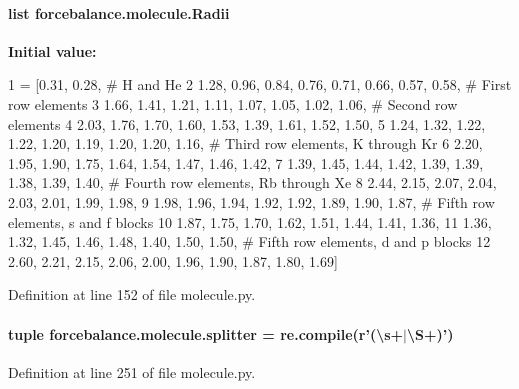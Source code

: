 \hypertarget{namespaceforcebalance_1_1molecule_a74f55a89a14ca676b5a06441d1fdab19}{
\paragraph[{Radii}]{\setlength{\rightskip}{0pt plus 5cm}list forcebalance.\-molecule.\-Radii}}\label{namespaceforcebalance_1_1molecule_a74f55a89a14ca676b5a06441d1fdab19}
{\bfseries Initial value\-:}
\begin{DoxyCode}
1 = [0.31, 0.28, \textcolor{comment}{# H and He}
2          1.28, 0.96, 0.84, 0.76, 0.71, 0.66, 0.57, 0.58, \textcolor{comment}{# First row elements}
3          1.66, 1.41, 1.21, 1.11, 1.07, 1.05, 1.02, 1.06, \textcolor{comment}{# Second row elements}
4          2.03, 1.76, 1.70, 1.60, 1.53, 1.39, 1.61, 1.52, 1.50, 
5          1.24, 1.32, 1.22, 1.22, 1.20, 1.19, 1.20, 1.20, 1.16, \textcolor{comment}{# Third row elements, K through Kr}
6          2.20, 1.95, 1.90, 1.75, 1.64, 1.54, 1.47, 1.46, 1.42, 
7          1.39, 1.45, 1.44, 1.42, 1.39, 1.39, 1.38, 1.39, 1.40, \textcolor{comment}{# Fourth row elements, Rb through Xe}
8          2.44, 2.15, 2.07, 2.04, 2.03, 2.01, 1.99, 1.98, 
9          1.98, 1.96, 1.94, 1.92, 1.92, 1.89, 1.90, 1.87, \textcolor{comment}{# Fifth row elements, s and f blocks}
10          1.87, 1.75, 1.70, 1.62, 1.51, 1.44, 1.41, 1.36, 
11          1.36, 1.32, 1.45, 1.46, 1.48, 1.40, 1.50, 1.50, \textcolor{comment}{# Fifth row elements, d and p blocks}
12          2.60, 2.21, 2.15, 2.06, 2.00, 1.96, 1.90, 1.87, 1.80, 1.69]
\end{DoxyCode}


Definition at line 152 of file molecule.\-py.

\hypertarget{namespaceforcebalance_1_1molecule_a09d04113accea9c88b084051c5de29d1}{
\paragraph[{splitter}]{\setlength{\rightskip}{0pt plus 5cm}tuple forcebalance.\-molecule.\-splitter = re.\-compile(r'(\textbackslash{}s+$|$\textbackslash{}S+)')}}\label{namespaceforcebalance_1_1molecule_a09d04113accea9c88b084051c5de29d1}


Definition at line 251 of file molecule.\-py.

